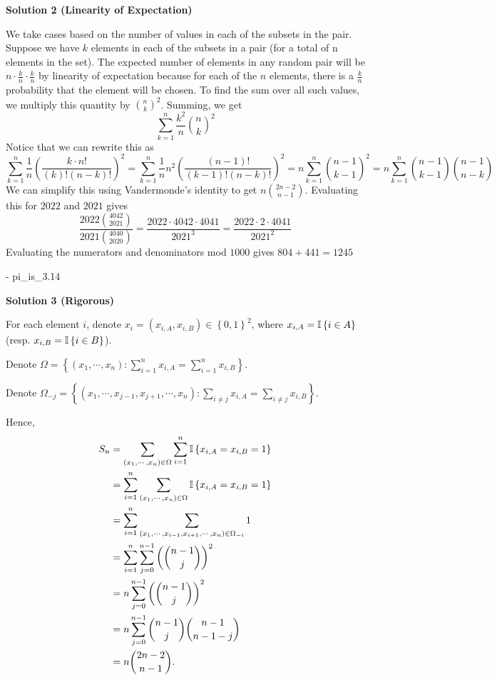 \begin{enumerate}
\textbf{Solution 2 (Linearity of Expectation)}

We take cases based on the number of values in each of the subsets in the pair. Suppose we have $k$ elements in each of the subsets in a pair (for a total of n elements in the set). The expected number of elements in any random pair will be $n \cdot \frac{k}{n} \cdot \frac{k}{n}$ by linearity of expectation because for each of the $n$ elements, there is a $\frac{k}{n}$ probability that the element will be chosen. To find the sum over all such values, we multiply this quantity by  $\binom{n}{k}^2$. Summing, we get 
 \[\sum_{k=1}^{n} \frac{k^2}{n} \binom{n}{k}^2\] Notice that we can rewrite this as 
 \[\sum_{k=1}^{n} \frac{1}{n} \left(\frac{k \cdot n!}{(k)!(n - k)!}\right)^2 = \sum_{k=1}^{n} \frac{1}{n} n^2 \left(\frac{(n-1)!}{(k - 1)!(n - k)!}\right)^2 = n \sum_{k=1}^{n} \binom{n - 1}{k - 1}^2 = n \sum_{k=1}^{n} \binom{n - 1}{k - 1}\binom{n - 1}{n - k}\] We can simplify this using Vandermonde's identity to get $n \binom{2n - 2}{n - 1}$. Evaluating this for $2022$ and $2021$ gives 
 \[\frac{2022\binom{4042}{2021}}{2021\binom{4040}{2020}} = \frac{2022 \cdot 4042 \cdot 4041}{2021^3} = \frac{2022 \cdot 2 \cdot 4041}{2021^2}\] Evaluating the numerators and denominators mod $1000$ gives $804 + 441 = 1\boxed{245}$

 - pi\_is\_3.14

 



\textbf{Solution 3 (Rigorous)}

For each element $i$, denote $x_i = \left( x_{i, A}, x_{i, B} \right) \in \left\{ 0 , 1 \right\}^2$, where $x_{i, A} = \Bbb I \left\{ i \in A \right\}$ (resp. $x_{i, B} = \Bbb I \left\{ i \in B \right\}$).

 Denote $\Omega = \left\{ (x_1, \cdots , x_n): \sum_{i = 1}^n x_{i, A} = \sum_{i = 1}^n x_{i, B} \right\}$.

 Denote $\Omega_{-j} = \left\{ (x_1, \cdots , x_{j-1} , x_{j+1} , \cdots , x_n): \sum_{i \neq j} x_{i, A} = \sum_{i \neq j} x_{i, B} \right\}$.

 Hence,
 \begin{align*} S_n & = \sum_{(x_1, \cdots , x_n) \in \Omega} \sum_{i = 1}^n \Bbb I \left\{ x_{i, A} = x_{i, B} = 1 \right\} \\ & = \sum_{i = 1}^n \sum_{(x_1, \cdots , x_n) \in \Omega} \Bbb I \left\{ x_{i, A} = x_{i, B} = 1 \right\} \\ & = \sum_{i = 1}^n \sum_{(x_1, \cdots , x_{i-1} , x_{i+1} , \cdots , x_n) \in \Omega_{-i}} 1  \\ & = \sum_{i = 1}^n \sum_{j=0}^{n-1} \left( \binom{n-1}{j} \right)^2 \\ & = n \sum_{j=0}^{n-1} \left( \binom{n-1}{j} \right)^2 \\ & = n \sum_{j=0}^{n-1} \binom{n-1}{j} \binom{n-1}{n-1-j} \\ & = n \binom{2n-2}{n-1} . \end{align*}



\end{enumerate}
